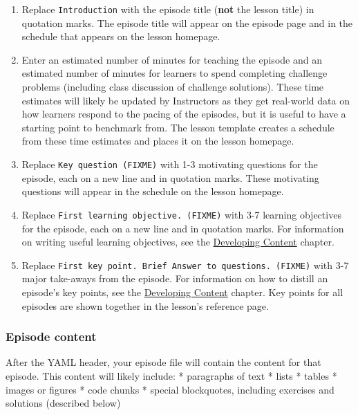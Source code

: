 \documentclass[]{book}
\providecommand{\tightlist}{%
  \setlength{\itemsep}{0pt}\setlength{\parskip}{0pt}}
\begin{document}
\begin{enumerate}
\def\labelenumi{\arabic{enumi}.}
\tightlist
\item
  Replace \texttt{Introduction} with the episode title (\textbf{not} the lesson title) in quotation marks. The episode
  title will appear on the episode page and in the schedule that appears on the lesson homepage.
\item
  Enter an estimated number of minutes for teaching the episode and an estimated number of minutes for learners to spend completing challenge problems (including class discussion of challenge solutions). These time estimates
  will likely be updated by Instructors as they get real-world data on how learners respond to the pacing of
  the episodes, but it is useful to have a starting point to benchmark from. The lesson template creates a schedule
  from these time estimates and places it on the lesson homepage.
\item
  Replace \texttt{Key\ question\ (FIXME)} with 1-3 motivating questions for the episode, each on a new line and in quotation marks. These motivating questions will appear in the schedule on the lesson homepage.
\item
  Replace \texttt{First\ learning\ objective.\ (FIXME)} with 3-7 learning objectives for the episode, each on a new line and in quotation marks. For information on writing useful learning objectives, see the \href{https://carpentries.github.io/curriculum-development/developing-content.html}{Developing Content} chapter.
\item
  Replace \texttt{First\ key\ point.\ Brief\ Answer\ to\ questions.\ (FIXME)} with 3-7 major take-aways from the episode. For
  information on how to distill an episode's key points, see the \href{https://carpentries.github.io/curriculum-development/developing-content.html}{Developing Content} chapter. Key points for all episodes are shown
  together in the lesson's reference page.
\end{enumerate}

\hypertarget{episode-content}{%
\subsubsection{Episode content}\label{episode-content}}

After the YAML header, your episode file will contain the content for that episode. This content will likely
include:
* paragraphs of text
* lists
* tables
* images or figures
* code chunks
* special blockquotes, including exercises and solutions (described below)
\end{document}
